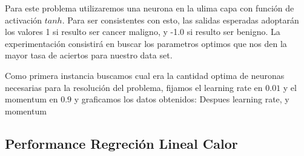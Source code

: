 Para este problema utilizaremos una neurona en la ulima capa con función de activación $tanh$. Para ser consistentes con esto, las salidas esperadas adoptarán los valores 1 si resulto ser cancer maligno, y -1.0 si resulto ser benigno. La experimentación consistirá en buscar los parametros optimos que nos den la mayor tasa de aciertos para nuestro data set.

Como primera instancia buscamos cual era la cantidad optima de neuronas necesarias para la resolución del problema, fijamos el learning rate en $0.01$ y el momentum en $0.9$ y graficamos los datos obtenidos:
Despues learning rate, y momentum

\subsection{Performance Regreción Lineal Calor} 

